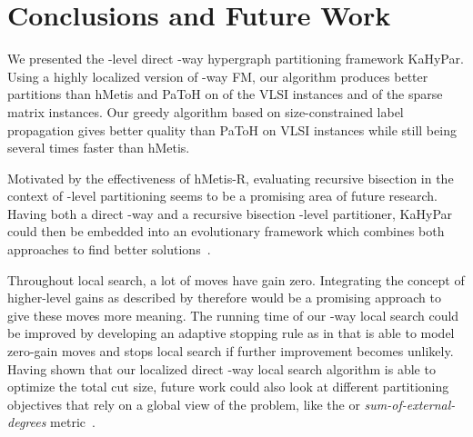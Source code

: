 \documentclass[runningheads,a4paper]{llncs}
\begin{document}
\section{Conclusions and Future Work}  \label{Conclusions}
We presented the -level direct -way hypergraph partitioning framework KaHyPar.
Using a highly localized version of -way FM, our algorithm produces better partitions
than hMetis and PaToH on  of the VLSI instances and  of the sparse matrix instances. 
Our greedy algorithm based on size-constrained label propagation gives better quality than PaToH on VLSI instances 
while still being several times faster than hMetis.

Motivated by the effectiveness of hMetis-R, evaluating recursive bisection in the context of -level partitioning
seems to be a promising area of future research. Having both a direct -way and a recursive bisection -level 
partitioner, KaHyPar could then be embedded into an evolutionary framework which combines both approaches to find better solutions~\cite{SandersS12distributed}.

Throughout local search, a lot of moves have gain zero.
Integrating the concept of higher-level gains as described by
\cite{LockedNets,HypergraphKFM} therefore would be a promising approach to give these moves more
meaning. 
The running time of our -way local search could be improved by developing an adaptive
stopping rule as in \cite{nGP} that is able to model zero-gain moves and stops local search if further improvement becomes unlikely.
Having shown that our localized direct -way local search algorithm is able to optimize the total cut size, future work
could also look at different partitioning objectives that rely on a global view of the problem, like the  or \emph{sum-of-external-degrees}
metric~\cite{hMetisKway}.

{


}

\appendix
\newpage
\end{document}
